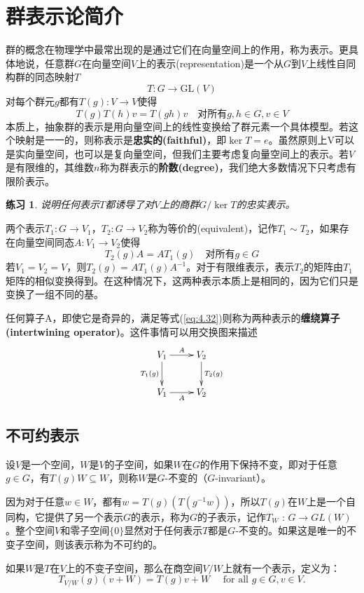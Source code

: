 \documentclass[hyperref,UTF8]{ctexbook}
\newtheorem*{exercise}{练习}
\begin{document}
\section{群表示论简介}
群的概念在物理学中最常出现的是通过它们在向量空间上的作用，称为表示。更具体地说，任意群$G$在向量空间$V$上的表示(representation)是一个从$G$到$V$上线性自同构群的同态映射$T$
$$T:G\rightarrow \mathrm{GL}(V)$$
对每个群元$g$都有$T(g):V\rightarrow V $使得
$$T(g)T(h)v=T(gh)v\quad\text{对所有}g,h\in G,v\in V$$
本质上，抽象群的表示是用向量空间上的线性变换给了群元素一个具体模型。若这个映射是一一的，则称表示是\textbf{忠实的(faithful)}，即$\ker T=e$。虽然原则上V可以是实向量空间，也可以是复向量空间，但我们主要考虑复向量空间上的表示。若$V$是有限维的，其维数$n$称为群表示的\textbf{阶数(degree)}，我们绝大多数情况下只考虑有限阶表示。
\begin{exercise}
    说明任何表示$T$都诱导了对$V$上的商群$G/ \ker T$的忠实表示。
\end{exercise}
两个表示$T_1:G\rightarrow V_1$，$T_2:G\rightarrow V_2$称为等价的(equivalent)，记作$T_1\sim T_2$，如果存在向量空间同态$A:V_1\rightarrow V_2$使得
\begin{equation}
    T_2(g)A=AT_1(g)\quad\text{对所有}g\in G \label{eq:4.32}
\end{equation}
若$V_1=V_2=V$，则$T_2(g)=AT_1(g)A^{-1}$。对于有限维表示，表示$T_2$的矩阵由$T_1$矩阵的相似变换得到。在这种情况下，这两种表示本质上是相同的，因为它们只是变换了一组不同的基。

任何算子A，即使它是奇异的，满足等式(\ref{eq:4.32})则称为两种表示的\textbf{缠绕算子(intertwining operator)}。这件事情可以用交换图来描述
$$
\xymatrix{
  V_1 \ar[r]^A \ar[d]_{T_1(g)} &
  V_2 \ar[d]^{T_2(g)} \\
  V_1 \ar[r]_{A} &
  V_2
}$$
\subsection{不可约表示}
设$V$是一个空间，$W$是$V$的子空间，如果$W$在$G$的作用下保持不变，即对于任意$g \in G$，有$T(g) W \subseteq W$，则称$W$是$G$-不变的（$G$-invariant）。

因为对于任意$w \in W$，都有$w=T(g)\left(T\left(g^{-1} w\right)\right)$，所以$T(g)$在$W$上是一个自同构，它提供了另一个表示$G$的表示，称为$G$的子表示，记作$T_W$ : $G \rightarrow G L(W)$。整个空间$V$和零子空间$\{0\}$显然对于任何表示$T$都是$G$-不变的。如果这是唯一的不变子空间，则该表示称为不可约的。

如果$W$是$T$在$V$上的不变子空间，那么在商空间$V / W$上就有一个表示，定义为：$$T_{V / W}(g)(v+W)=T(g) v+W \quad \text { for all } g \in G, v \in V .$$
\end{document}
